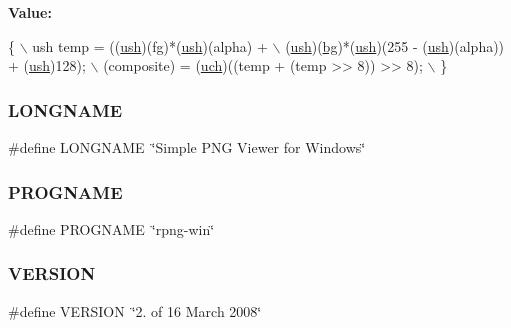 {\bfseries Value\+:}
\begin{DoxyCode}
\{               \(\backslash\)
    ush temp = ((\mbox{\hyperlink{readpng_8h_a3754180d606d4ed15468d15d9665aa2e}{ush}})(fg)*(\mbox{\hyperlink{readpng_8h_a3754180d606d4ed15468d15d9665aa2e}{ush}})(alpha) +                          \(\backslash\)
                (\mbox{\hyperlink{readpng_8h_a3754180d606d4ed15468d15d9665aa2e}{ush}})(\mbox{\hyperlink{rpng2-win_8c_a808fa6d3573a86afa3ba7698a65b1ef6}{bg}})*(\mbox{\hyperlink{readpng_8h_a3754180d606d4ed15468d15d9665aa2e}{ush}})(255 - (\mbox{\hyperlink{readpng_8h_a3754180d606d4ed15468d15d9665aa2e}{ush}})(alpha)) + (\mbox{\hyperlink{readpng_8h_a3754180d606d4ed15468d15d9665aa2e}{ush}})128);  \(\backslash\)
    (composite) = (\mbox{\hyperlink{readpng_8h_af3307af5922c72924a837559c801a8a4}{uch}})((temp + (temp >> 8)) >> 8);               \(\backslash\)
\}
\end{DoxyCode}
\mbox{\label{rpng-win_8c_ae8176192ea4d52bb0acbcfeaaffb3bd8}} 
\subsubsection{\texorpdfstring{L\+O\+N\+G\+N\+A\+ME}{LONGNAME}}
{\footnotesize\ttfamily \#define L\+O\+N\+G\+N\+A\+ME~\char`\"{}Simple P\+NG Viewer for Windows\char`\"{}}

\mbox{\label{rpng-win_8c_a8c9afb758de9a0355c93fc926b8ce6b1}} 
\subsubsection{\texorpdfstring{P\+R\+O\+G\+N\+A\+ME}{PROGNAME}}
{\footnotesize\ttfamily \#define P\+R\+O\+G\+N\+A\+ME~\char`\"{}rpng-\/win\char`\"{}}

\mbox{\label{rpng-win_8c_a1c6d5de492ac61ad29aec7aa9a436bbf}} 
\subsubsection{\texorpdfstring{V\+E\+R\+S\+I\+ON}{VERSION}}
{\footnotesize\ttfamily \#define V\+E\+R\+S\+I\+ON~\char`\"{}2. of 16 March 2008\char`\"{}}



